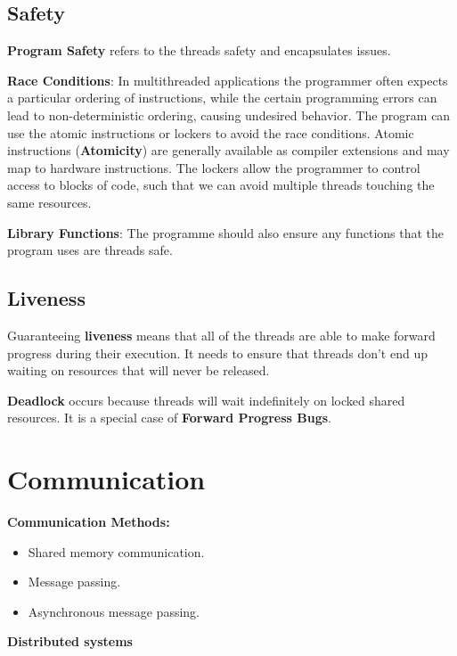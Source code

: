 \documentclass{article}
\begin{document}
\subsection{Safety}

\textbf{Program Safety} refers to the threads safety and encapsulates issues.


\textbf{Race Conditions}: In multithreaded applications the programmer often expects a particular ordering of instructions, while the certain programming errors can lead to non-deterministic ordering, causing undesired behavior. The program can use the atomic instructions or lockers to avoid the race conditions. Atomic instructions (\textbf{Atomicity}) are generally available as compiler extensions and may map to hardware instructions. The lockers allow the programmer to control access to blocks of code, such that we can avoid multiple threads touching the same resources.


\textbf{Library Functions}: The programme should also ensure any functions that the program uses are threads safe.


\subsection{Liveness}

Guaranteeing \textbf{liveness} means that all of the threads are able to make forward progress during their execution. It needs to ensure that threads don’t end up waiting on resources that will never be released.


\textbf{Deadlock} occurs because threads will wait indefinitely on locked shared resources. It is a special case of \textbf{Forward Progress Bugs}.



\section{Communication}

\textbf{Communication Methods:}

\begin{itemize}
    \item Shared memory communication.
    \item Message passing.
    \item Asynchronous message passing.
\end{itemize}

\textbf{Distributed systems}
\end{document}
